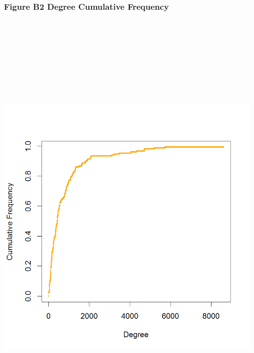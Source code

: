 \documentclass[]{article}
\begin{document}
\newpage

\subsubsection{Figure B2 Degree Cumulative
Frequency}\label{figure-b2-degree-cumulative-frequency}

\section{\texorpdfstring{\protect\includegraphics[height=8.33333in]{images/deg_cumfreq.png}}{Degree Cumulative Frequency}}\label{degree-cumulative-frequency}

\newpage
\end{document}
